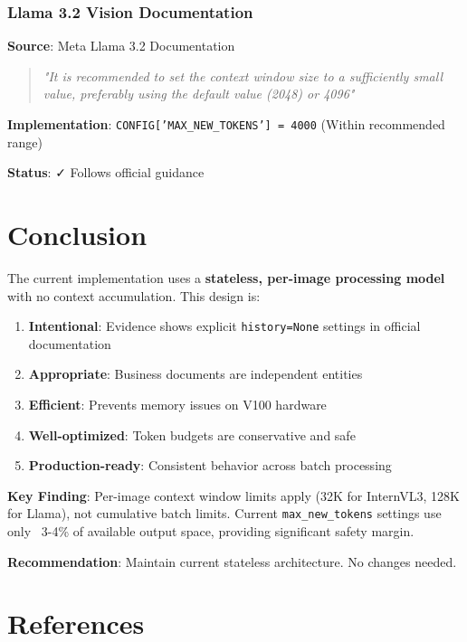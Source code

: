 \documentclass[11pt,a4paper]{article}
\newcommand{\cmark}{\textcolor{green!70!black}{✓}}
\begin{document}
\subsubsection{Llama 3.2 Vision Documentation}

\textbf{Source}: Meta Llama 3.2 Documentation

\begin{quote}
\textit{"It is recommended to set the context window size to a sufficiently small value, preferably using the default value (2048) or 4096"}
\end{quote}

\textbf{Implementation}: \texttt{CONFIG['MAX\_NEW\_TOKENS'] = 4000} (Within recommended range)

\textbf{Status}: \cmark{} Follows official guidance

\section{Conclusion}

The current implementation uses a \textbf{stateless, per-image processing model} with no context accumulation. This design is:

\begin{enumerate}[leftmargin=*]
    \item \textbf{Intentional}: Evidence shows explicit \texttt{history=None} settings in official documentation
    \item \textbf{Appropriate}: Business documents are independent entities
    \item \textbf{Efficient}: Prevents memory issues on V100 hardware
    \item \textbf{Well-optimized}: Token budgets are conservative and safe
    \item \textbf{Production-ready}: Consistent behavior across batch processing
\end{enumerate}

\textbf{Key Finding}: Per-image context window limits apply (32K for InternVL3, 128K for Llama), not cumulative batch limits. Current \texttt{max\_new\_tokens} settings use only ~3-4\% of available output space, providing significant safety margin.

\textbf{Recommendation}: Maintain current stateless architecture. No changes needed.

\section{References}
\end{document}
